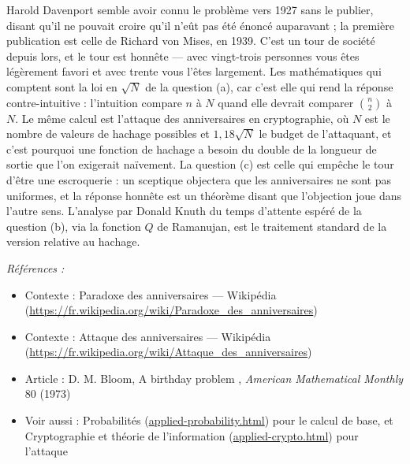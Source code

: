 \documentclass[11pt]{article}
\newenvironment{refs}{\par\small\noindent\emph{Références :}\begin{itemize}\setlength\itemsep{0pt}}{\end{itemize}\normalsize}
\begin{document}
\noindent Harold Davenport semble avoir connu le problème vers 1927 sans le publier,
disant qu'il ne pouvait croire qu'il n'eût pas été énoncé auparavant ; la première
publication est celle de Richard von Mises, en 1939. C'est un tour de société depuis lors, et
le tour est honnête --- avec vingt-trois personnes vous êtes légèrement favori et avec trente
vous l'êtes largement. Les mathématiques qui comptent sont la loi en $ \sqrt{N} $ de la
question (a), car c'est elle qui rend la réponse contre-intuitive : l'intuition compare
$ n $ à $ N $ quand elle devrait comparer $ \binom{n}{2} $ à $ N $. Le même calcul
est l'attaque des anniversaires en cryptographie, où $ N $ est le nombre de valeurs de
hachage possibles et $ 1{,}18\sqrt{N} $ le budget de l'attaquant, et c'est pourquoi une
fonction de hachage a besoin du double de la longueur de sortie que l'on exigerait
naïvement. La question (c) est celle qui empêche le tour d'être une escroquerie : un
sceptique objectera que les anniversaires ne sont pas uniformes, et la réponse honnête est
un théorème disant que l'objection joue dans l'autre sens. L'analyse par Donald Knuth du
temps d'attente espéré de la question (b), via la fonction $ Q $ de Ramanujan, est le
traitement standard de la version relative au hachage.

\begin{refs}
\item Contexte : Paradoxe des anniversaires --- Wikipédia (\url{https://fr.wikipedia.org/wiki/Paradoxe_des_anniversaires})
\item Contexte : Attaque des anniversaires --- Wikipédia (\url{https://fr.wikipedia.org/wiki/Attaque_des_anniversaires})
\item Article : D. M. Bloom, \og{} A birthday problem \fg{}, \textit{American Mathematical Monthly} 80 (1973)
\item Voir aussi : Probabilités (\url{applied-probability.html}) pour le calcul de base, et Cryptographie et théorie de l'information (\url{applied-crypto.html}) pour l'attaque
\end{refs}

\bigskip
\end{document}
